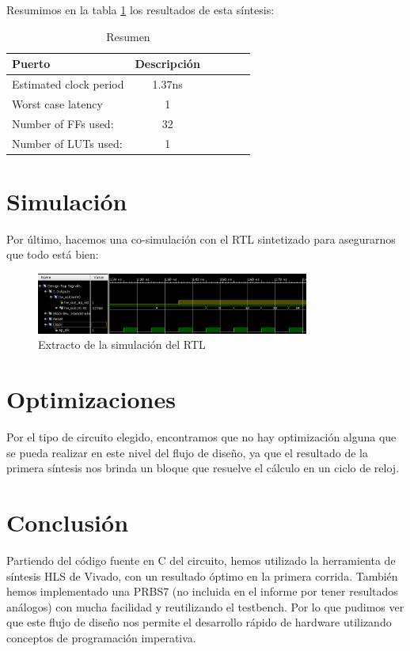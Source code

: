 Resumimos en la tabla \ref{tab:resumen31} los resultados de esta síntesis:
\begin{table}[!h]
\centering
\caption{Resumen}
\label{tab:resumen31}
\begin{tabular}{@{}lccccc@{}}
\toprule
Puerto & Descripción\\ \midrule
Estimated clock period  & 1.37ns     \\ \midrule
Worst case latency &  1 \\\midrule
Number of FFs used: & 32\\\midrule
Number of LUTs used: & 1 \\\bottomrule
\end{tabular}
\end{table}

\section{Simulación}

Por último, hacemos una co-simulación con el RTL sintetizado para asegurarnos que todo está bien:
\begin{figure}[!h]
\centering
\includegraphics[width=0.8\textwidth]{figuras/waveform-prbs31}
\caption{Extracto de la simulación del RTL}
\label{fig:waveform-prbs31}
\end{figure}
\section{Optimizaciones}
Por el tipo de circuito elegido, encontramos que no hay optimización alguna que se pueda realizar en este nivel del flujo de diseño, ya que el resultado de la primera síntesis nos brinda un bloque que resuelve el cálculo en un ciclo de reloj.

\section{Conclusión}
Partiendo del código fuente en C del circuito, hemos utilizado la herramienta de síntesis HLS de Vivado, con un resultado óptimo en la primera corrida. También hemos implementado una PRBS7 (no incluida en el informe por tener resultados análogos) con mucha facilidad y reutilizando el testbench. Por lo que pudimos ver que este flujo de diseño nos permite el desarrollo rápido de hardware utilizando conceptos de programación imperativa.


